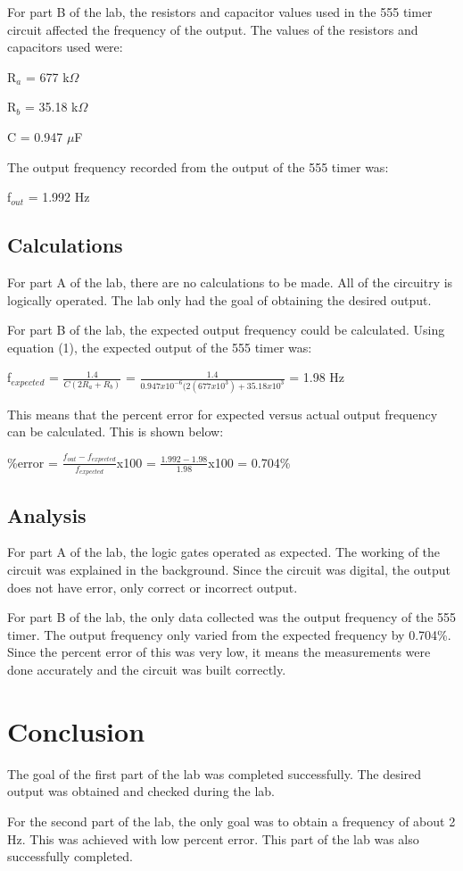 \documentclass[twocolumn, amsmath]{revtex4}
\begin{document}
For part B of the lab, the resistors and capacitor values used in the 555 timer circuit affected the frequency of the output. The values of the resistors and capacitors used were:

R$_a$ = 677 k$\Omega$

R$_b$ = 35.18 k$\Omega$

C = 0.947 $\mu$F

The output frequency recorded from the output of the 555 timer was:

f$_{out}$ = 1.992 Hz

\subsection{Calculations}
For part A of the lab, there are no calculations to be made. All of the circuitry is logically operated. The lab only had the goal of obtaining the desired output.

For part B of the lab, the expected output frequency could be calculated. %
Using equation (1), the expected output of the 555 timer was:

f$_{expected}$ = $\frac{1.4}{C(2R_a + R_b)}$ = $\frac{1.4}{0.947x10^{-6}(2(677x10^3) + 35.18x10^3}$ = 1.98 Hz

This means that the percent error for expected versus actual output frequency can be calculated. This is shown below:

\%error = $\frac{f_{out} - f_{expected}}{f_{expected}}$x100 = $\frac{1.992 - 1.98}{1.98}$x100 = 0.704\%

\subsection{Analysis}
For part A of the lab, the logic gates operated as expected. The working of the circuit was explained in the background. Since the circuit was digital, the output does not have error, only correct or incorrect output.

For part B of the lab, the only data collected was the output frequency of the 555 timer. The output frequency only varied from the expected frequency by 0.704\%. Since the percent error of this was very low, it means the measurements were done accurately and the circuit was built correctly.





\section{Conclusion}
The goal of the first part of the lab was completed successfully. The desired output was obtained and checked during the lab.

For the second part of the lab, the only goal was to obtain a frequency of about 2 Hz. This was achieved with low percent error. This part of the lab was also successfully completed.
\end{document}
